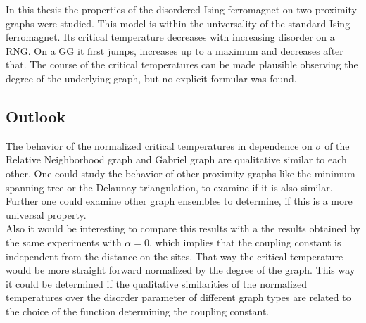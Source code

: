 In this thesis the properties of the disordered Ising ferromagnet on two
proximity graphs were studied. This model is within the universality of
the standard Ising ferromagnet. Its critical temperature decreases with
increasing disorder on a RNG. On a GG it first jumps, increases up to
a maximum and decreases after that. The course of the critical
temperatures can be made plausible observing the degree of the underlying
graph, but no explicit formular was found.

\subsection{Outlook}
    The behavior of the normalized critical temperatures in dependence
    on \(\sigma\) of the Relative Neighborhood graph and Gabriel graph
    are qualitative similar to each other. One could study the behavior
    of other proximity graphs like the minimum spanning tree or the
    Delaunay triangulation, to examine if it is also similar. Further
    one could examine other graph ensembles to determine, if this is a
    more universal property.\\
    Also it would be interesting to compare this results with a the
    results obtained by the same experiments with \(\alpha = 0\), which
    implies that the coupling constant is independent from the distance
    on the sites. That way the critical temperature would be more
    straight forward normalized by the degree of the graph. This way it
    could be determined if the qualitative similarities of the
    normalized temperatures over the disorder parameter of different
    graph types are related to the choice of the function determining the
    coupling constant.
